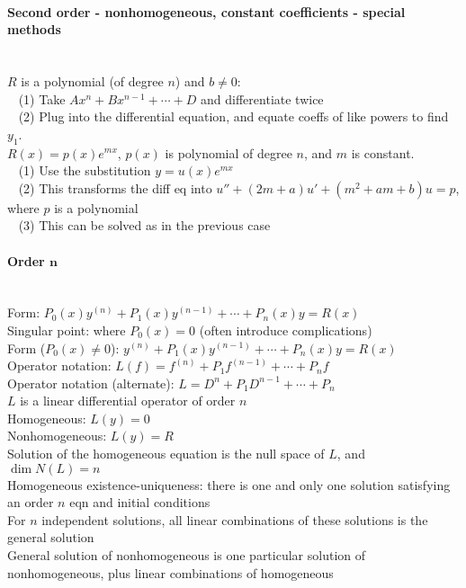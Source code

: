 \documentclass[10pt]{article}
\begin{document}
\paragraph{Second order - nonhomogeneous, constant coefficients - special methods}\ \\
$R$ is a polynomial (of degree $n$) and $b \neq 0$:\\
$\phantom{x}$ (1) Take $Ax^n+Bx^{n-1}+\cdots+D$ and differentiate twice\\
$\phantom{x}$ (2) Plug into the differential equation, and equate coeffs of like powers to find $y_1$.\\
$R(x)=p(x)e^{mx}$, $p(x)$ is polynomial of degree $n$, and $m$ is constant.\\
$\phantom{x}$ (1) Use the substitution $y=u(x)e^{mx}$\\
$\phantom{x}$ (2) This transforms the diff eq into $u''+(2m+a)u'+(m^2+am+b)u=p$, where $p$ is a polynomial\\
$\phantom{x}$ (3) This can be solved as in the previous case

\paragraph{Order $\boldsymbol{n}$}\ \\
Form: $P_0(x)y^{(n)} + P_1(x)y^{(n-1)} + \dotsb + P_n(x)y = R(x)$\\
Singular point: where $P_0(x) = 0$ (often introduce complications)\\
Form ($P_0(x) \neq 0$): $y^{(n)} + P_1(x)y^{(n-1)} + \dotsb + P_n(x)y = R(x)$\\
Operator notation: $L(f) = f^{(n)} + P_1f^{(n-1)} + \dotsb + P_nf$\\
Operator notation (alternate): $L = D^n + P_1 D^{n-1} + \dotsb + P_n$\\
$L$ is a linear differential operator of order $n$\\
Homogeneous: $L(y) = 0$\\
Nonhomogeneous: $L(y) = R$\\
Solution of the homogeneous equation is the null space of $L$, and $\dim N(L) = n$\\
Homogeneous existence-uniqueness: there is one and only one solution satisfying an order $n$ eqn and initial conditions\\
For $n$ independent solutions, all linear combinations of these solutions is the general solution\\
General solution of nonhomogeneous is one particular solution of nonhomogeneous, plus linear combinations of homogeneous
\end{document}
